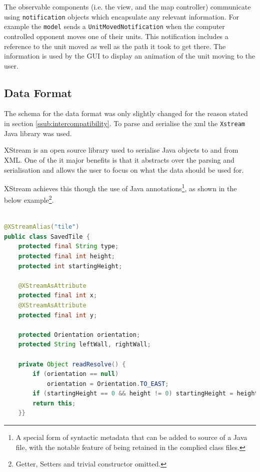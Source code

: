 

The observable components (i.e. the view, and the map controller) communicate using \texttt{notification} objects which encapsulate any relevant information. For example the \texttt{model} sends a \texttt{UnitMovedNotification} when the computer controlled opponent moves one of their units. This notification includes a reference to the unit moved as well as the path it took to get there. The information is used by the GUI to display an animation of the unit moving to the user.

\clearpage
\subsection{Data Format}
\label{sub:data_format}

The schema for the data format was only slightly changed for the reason stated in section \ref{ssub:intercompatibility}. To parse and serialise the xml the \texttt{Xstream} Java library was used.
 
XStream is an open source library used to serialise Java objects to and from XML. One of the it major benefits is that it abstracts over the parsing and serialisation and allows the user to focus on what the data should be used for. 

XStream achieves this though the use of Java annotations\footnote{A special form of syntactic metadata that can be added to source of a Java file, with the notable feature of being retained in the complied class files.}, as shown in the below example\footnote{Getter, Setters and trivial constructor omitted.}.

\begin{lstlisting}[caption=Example of class that is serialisable with XStream, label=lst:SavedTile, language=java] %Java
	
@XStreamAlias("tile")
public class SavedTile {
	protected final String type;
	protected final int height; 
	protected int startingHeight;
	
	@XStreamAsAttribute
	protected final int x;
	@XStreamAsAttribute
	protected final int y;

	protected Orientation orientation;
	protected String leftWall, rightWall;
	
	private Object readResolve() {
		if (orientation == null)  
			orientation = Orientation.TO_EAST;
		if (startingHeight == 0 && height != 0) startingHeight = height;
		return this;
	}}
\end{lstlisting}

